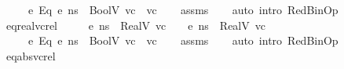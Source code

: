 \begin{isabellebody}
\ \ \ {\isachardoublequoteopen}{\isasymLambda}{\isacharcomma}{\kern0pt}{\isasymGamma}{\isacharcomma}{\kern0pt}{\isasymOmega}\ {\isasymturnstile}\ {\isasymlangle}e{}\ {\isasymguillemotleft}Eq{\isasymguillemotright}\ e{}{\isacharcomma}{\kern0pt}\ ns{\isasymrangle}\ {\isasymDown}\ BoolV\ {\isacharparenleft}{\kern0pt}vc{}\ {\isacharequal}{\kern0pt}\ vc{}{\isacharparenright}{\kern0pt}{\isachardoublequoteclose}\isanewline
%
\isadelimproof
\ \ %
\endisadelimproof
%
\isatagproof
{}\isamarkupfalse%
\ assms\isanewline
\ \ \isamarkupfalse%
\ {\isacharparenleft}{\kern0pt}auto\ intro{\isacharcolon}{\kern0pt}\ RedBinOp{\isacharparenright}{\kern0pt}%
\endisatagproof
{\isafoldproof}%
%
\isadelimproof
\isanewline
%
\endisadelimproof
\isanewline
{}\isamarkupfalse%
\ eq{\isacharunderscore}{\kern0pt}real{\isacharunderscore}{\kern0pt}vc{\isacharunderscore}{\kern0pt}rel{\isacharcolon}{\kern0pt}\isanewline
\ \ \ {\isachardoublequoteopen}{\isasymLambda}{\isacharcomma}{\kern0pt}{\isasymGamma}{\isacharcomma}{\kern0pt}{\isasymOmega}\ {\isasymturnstile}\ {\isasymlangle}e{}{\isacharcomma}{\kern0pt}\ ns{\isasymrangle}\ {\isasymDown}\ RealV\ vc{}{\isachardoublequoteclose}\ \ {\isachardoublequoteopen}{\isasymLambda}{\isacharcomma}{\kern0pt}{\isasymGamma}{\isacharcomma}{\kern0pt}{\isasymOmega}\ {\isasymturnstile}\ {\isasymlangle}e{}{\isacharcomma}{\kern0pt}\ ns{\isasymrangle}\ {\isasymDown}\ RealV\ vc{}{\isachardoublequoteclose}\isanewline
\ \ \ {\isachardoublequoteopen}{\isasymLambda}{\isacharcomma}{\kern0pt}{\isasymGamma}{\isacharcomma}{\kern0pt}{\isasymOmega}\ {\isasymturnstile}\ {\isasymlangle}e{}\ {\isasymguillemotleft}Eq{\isasymguillemotright}\ e{}{\isacharcomma}{\kern0pt}\ ns{\isasymrangle}\ {\isasymDown}\ BoolV\ {\isacharparenleft}{\kern0pt}vc{}\ {\isacharequal}{\kern0pt}\ vc{}{\isacharparenright}{\kern0pt}{\isachardoublequoteclose}\isanewline
%
\isadelimproof
\ \ %
\endisadelimproof
%
\isatagproof
{}\isamarkupfalse%
\ assms\isanewline
\ \ \isamarkupfalse%
\ {\isacharparenleft}{\kern0pt}auto\ intro{\isacharcolon}{\kern0pt}\ RedBinOp{\isacharparenright}{\kern0pt}%
\endisatagproof
{\isafoldproof}%
%
\isadelimproof
\isanewline
%
\endisadelimproof
\isanewline
{}\isamarkupfalse%
\ eq{\isacharunderscore}{\kern0pt}abs{\isacharunderscore}{\kern0pt}vc{\isacharunderscore}{\kern0pt}rel{\isacharcolon}{\kern0pt}\isanewline

\end{isabellebody}

